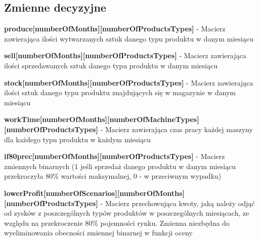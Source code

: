 \subsection{Zmienne decyzyjne}

\textbf{produce[numberOfMonths][numberOfProductsTypes]} - Macierz zawierająca ilości wytwarzanych sztuk danego typu produktu w danym miesiącu

\textbf{sell[numberOfMonths][numberOfProductsTypes]} - Macierz zawierająca ilości sprzedawanych sztuk danego typu produktu w danym miesiącu

\textbf{stock[numberOfMonths][numberOfProductsTypes]} - Macierz zawierająca ilości sztuk danego typu produktu znajdujących się w magazynie w danym miesiącu

\textbf{workTime[numberOfMonths][numberOfMachineTypes][numberOfProductsTypes]} - Macierz zawierająca czas pracy każdej maszyny dla każdego typu produktu w każdym miesiącu

\textbf{if80prec[numberOfMonths][numberOfProductsTypes]} - Macierz zmiennych binarnych (1 jeśli sprzedaż danego produktu w danym miesiącu przekroczyła 80\% wartości maksymalnej, 0 - w przeciwnym wypadku)

\textbf{lowerProfit[numberOfScenarios][numberOfMonths][numberOfProductsTypes]} - Macierz przechowująca kwoty, jaką należy odjąć od zysków z poszczególnych typów produktów w poszczególnych miesiącach, ze względu na przekroczenie 80\% pojemności rynku. Zmienna niezbędna do wyeliminowania obecności zmiennej binarnej w funkcji oceny

